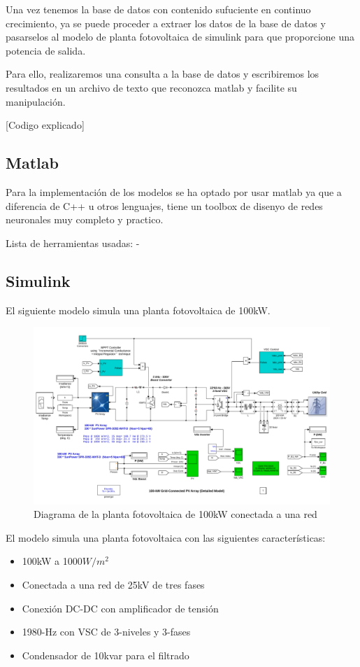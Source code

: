 Una vez tenemos la base de datos con contenido sufuciente en continuo crecimiento, ya se puede proceder a extraer los datos de la base de datos y pasarselos al modelo de planta fotovoltaica de simulink para que proporcione una potencia de salida.

Para ello, realizaremos una consulta a la base de datos y escribiremos los resultados en un archivo de texto que reconozca matlab y facilite su manipulación.

[Codigo explicado]


\subsection{Matlab}
\label{sub:Matlab} 

Para la implementación de los modelos se ha optado por usar matlab ya que a diferencia de C++ u otros lenguajes, tiene un toolbox de disenyo de redes neuronales muy completo y practico.

Lista de herramientas usadas:
- 




\subsection{Simulink} 
\label{sub:Simulink}

El siguiente modelo simula una planta fotovoltaica de 100kW. 

\begin{figure}[h]
    \includegraphics[width=\textwidth]{Ppv_diagram.png}
    \caption{Diagrama de la planta fotovoltaica de 100kW conectada a una red}
    \label{fig:Ppv_diagram}
\end{figure}


El modelo simula una planta fotovoltaica con las siguientes características:
\begin{itemize}
    \item 100kW a 1000$W/m^2$
    \item Conectada a una red de 25kV de tres fases
    \item Conexión DC-DC con amplificador de tensión
    \item 1980-Hz con VSC de 3-niveles y 3-fases
    \item Condensador de 10kvar para el filtrado
\end{itemize}

